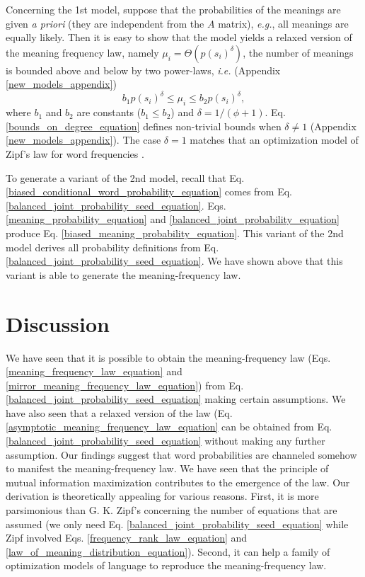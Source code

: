 \documentclass{article}
\begin{document}
Concerning the 1st model, suppose that the probabilities of the meanings are given {\em a priori} (they are independent from the $A$ matrix), {\em e.g.}, all meanings are equally likely. Then it is easy to show that the model yields a relaxed version of the meaning frequency law, namely $\mu_i = \Theta(p(s_i)^\delta)$, the number of meanings is bounded above and below by two power-laws, {\em i.e.} (Appendix \ref{new_models_appendix})
\begin{equation}
b_1 p(s_i)^\delta \leq \mu_i \leq b_2 p(s_i)^\delta,
\label{bounds_on_degree_equation}
\end{equation}
where $b_1$ and $b_2$ are constants ($b_1 \leq b_2$) and $\delta = 1/(\phi + 1)$. Eq. \ref{bounds_on_degree_equation} defines non-trivial bounds when $\delta \neq 1$ (Appendix \ref{new_models_appendix}). The case $\delta = 1$ matches that 
an optimization model of Zipf's law for word frequencies \cite{Ferrer2004e, Ferrer2014d}.

To generate a variant of the 2nd model, recall that Eq. \ref{biased_conditional_word_probability_equation} comes from Eq. \ref{balanced_joint_probability_seed_equation}. 
Eqs. \ref{meaning_probability_equation} and \ref{balanced_joint_probability_equation} produce 
Eq. \ref{biased_meaning_probability_equation}.
This variant of the 2nd model derives all probability definitions from Eq. \ref{balanced_joint_probability_seed_equation}. 
We have shown above that this variant is able to generate the meaning-frequency law.

\section*{Discussion}

We have seen that it is possible to obtain the meaning-frequency law (Eqs. \ref{meaning_frequency_law_equation} and \ref{mirror_meaning_frequency_law_equation}) from Eq. \ref{balanced_joint_probability_seed_equation} making certain assumptions. We have also seen that a relaxed version of the law (Eq. \ref{asymptotic_meaning_frequency_law_equation} can be obtained from Eq. \ref{balanced_joint_probability_seed_equation} without making any further assumption.
Our findings suggest that word probabilities are channeled somehow to manifest the meaning-frequency law. We have seen that the principle of mutual information maximization contributes to the emergence of the law. Our derivation is theoretically appealing for various reasons. First, it is more parsimonious than G. K. Zipf's concerning the number of equations that are assumed (we only need Eq. \ref{balanced_joint_probability_seed_equation} while Zipf involved Eqs. \ref{frequency_rank_law_equation} and \ref{law_of_meaning_distribution_equation}). Second, it can help a family of optimization models of language to reproduce the meaning-frequency law. %
\end{document}
